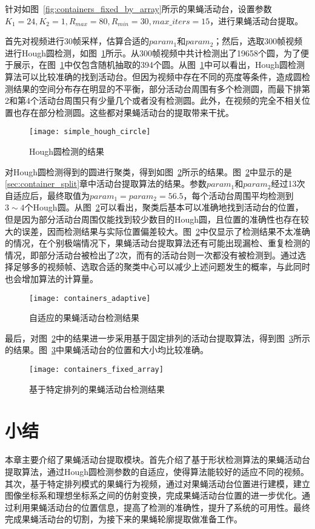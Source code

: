 针对如图~\ref{fig:containers_fixed_by_array}所示的果蝇活动台，设置参数 $K_1 = 24, K_2 = 1, R_{max} = 80, R_{min} = 30, max\_iters = 15$，进行果蝇活动台提取。

首先对视频进行30帧采样，估算合适的$param_1$和$param_2$；然后，选取300帧视频进行Hough圆检测，如图~\ref{fig:simple_hough_circle}所示。从300帧视频中共计检测出了19658个圆，为了便于展示，在图~\ref{fig:simple_hough_circle}中仅包含随机抽取的394个圆。从图~\ref{fig:simple_hough_circle}中可以看出，Hough圆检测算法可以比较准确的找到活动台。但因为视频中存在不同的亮度等条件，造成圆检测结果的空间分布存在明显的不平衡，部分活动台周围有多个检测圆，而最下排第2和第4个活动台周围只有少量几个或者没有检测圆。此外，在视频的完全不相关位置也存在部分检测圆。这些都对果蝇活动台的提取带来干扰。

\begin{figure}[htb]
\centering
\texttt{[image: simple\_hough\_circle]}
\caption{Hough圆检测的结果}
\label{fig:simple_hough_circle}
\end{figure}

对Hough圆检测得到的圆进行聚类，得到如图~\ref{fig:containers_adaptive}所示的结果。图~\ref{fig:containers_adaptive}中显示的是\ref{sec:container_split}章中活动台提取算法的结果。参数$param_1$和$param_2$经过13次自适应后，最终取值为$param_1=param_2=56.5$，每个活动台周围平均检测到$3\sim 4$个Hough圆。从图~\ref{fig:containers_adaptive}可以看出，聚类后基本可以准确地找到活动台的位置，但是因为部分活动台周围仅能找到较少数目的Hough圆，且位置的准确性也存在较大的误差，因而检测结果与实际位置偏差较大。图~\ref{fig:containers_adaptive}中仅显示了检测结果不太准确的情况，在个别极端情况下，果蝇活动台提取算法还有可能出现漏检、重复检测的情况，即部分活动台被检出了2次，而有的活动台则一次都没有被检测到。通过选择足够多的视频帧、选取合适的聚类中心可以减少上述问题发生的概率，与此同时也会增加算法的计算量。

\begin{figure}[htb]
\centering
\texttt{[image: containers\_adaptive]}
\caption{自适应的果蝇活动台检测结果}
\label{fig:containers_adaptive}
\end{figure}

最后，对图~\ref{fig:containers_adaptive}中的结果进一步采用基于固定排列的活动台提取算法，得到图~\ref{fig:containers_fixed_array}所示的结果。图~\ref{fig:containers_fixed_array}中果蝇活动台的位置和大小均比较准确。

\begin{figure}[htb]
\centering
\texttt{[image: containers\_fixed\_array]}
\caption{基于特定排列的果蝇活动台检测结果}
\label{fig:containers_fixed_array}
\end{figure}

\section{小结}

本章主要介绍了果蝇活动台提取模块。首先介绍了基于形状检测算法的果蝇活动台提取算法，通过Hough圆检测参数的自适应，使得算法能较好的适应不同的视频。其次，基于特定排列模式的果蝇行为视频，通过对果蝇活动台位置进行建模，建立图像坐标系和理想坐标系之间的仿射变换，完成果蝇活动台位置的进一步优化。通过利用果蝇活动台的位置信息，提高了检测的准确性，提升了系统的可用性。最终完成果蝇活动台的切割，为接下来的果蝇轮廓提取做准备工作。
